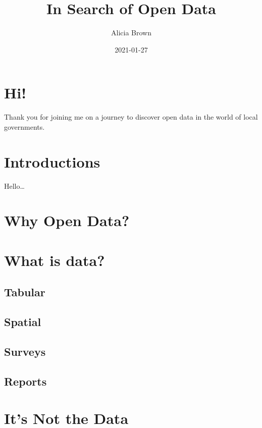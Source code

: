 \documentclass[
]{book}
\title{In Search of Open Data}
\author{Alicia Brown}
\date{2021-01-27}
\begin{document}
\maketitle

{
\setcounter{tocdepth}{1}
\tableofcontents
}
\hypertarget{hi}{%
\chapter{Hi!}\label{hi}}

Thank you for joining me on a journey to discover open data in the world of local governments.

\hypertarget{intro}{%
\chapter{Introductions}\label{intro}}

Hello\ldots{}

\hypertarget{why-open-data}{%
\chapter{Why Open Data?}\label{why-open-data}}

\hypertarget{what-is-data}{%
\chapter{What is data?}\label{what-is-data}}

\hypertarget{tabular}{%
\section{Tabular}\label{tabular}}

\hypertarget{spatial}{%
\section{Spatial}\label{spatial}}

\hypertarget{surveys}{%
\section{Surveys}\label{surveys}}

\hypertarget{reports}{%
\section{Reports}\label{reports}}

\hypertarget{it-about-info}{%
\chapter{It's Not the Data}\label{it-about-info}}
\end{document}
